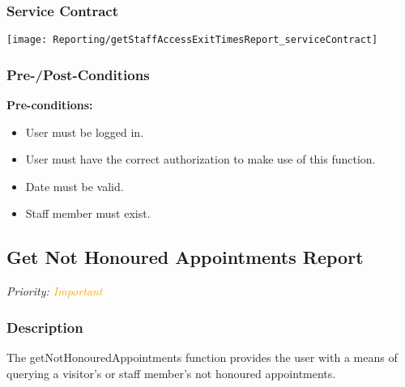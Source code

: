
\subsubsection{Service Contract}
\texttt{[image: Reporting/getStaffAccessExitTimesReport\_serviceContract]}
\subsubsection{Pre-/Post-Conditions}		
	\textbf{Pre-conditions:}
	\begin{itemize}
		\item User must be logged in.
		\item User must have the correct authorization to make use of this function.
		\item Date must be valid.
		\item Staff member must exist.
	\end{itemize}

\subsection{Get Not Honoured Appointments Report}
\textit{Priority: \textcolor{orange}{Important}}

\subsubsection{Description}
The getNotHonouredAppointments function provides the user with a means of querying a visitor's or staff member's not honoured appointments.

		
